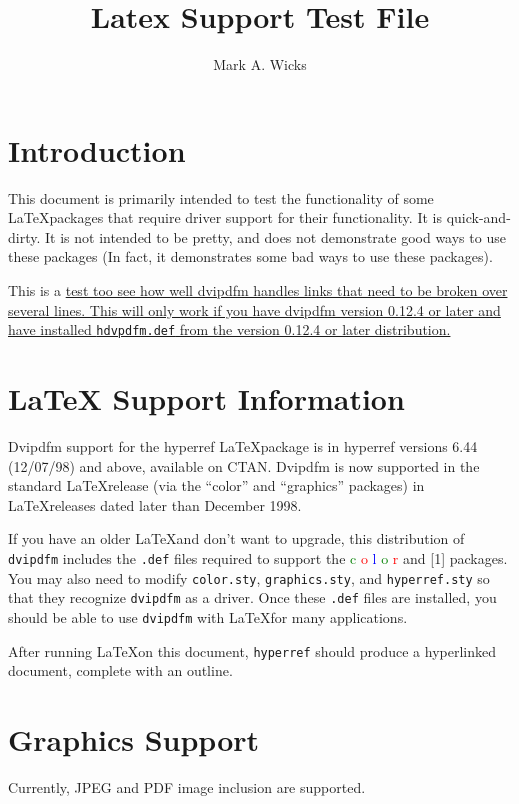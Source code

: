 \documentclass[dvipdfm]{article}
\title{\color{blue}Latex Support Test File}
\author{\color{green}Mark A. Wicks}
\begin{document}
\maketitle
\section{Introduction}
This document is primarily intended
to test the functionality
of some \LaTeX\space packages that require
driver support for their functionality.
It is quick-and-dirty.
It is not intended to be pretty, and
does not demonstrate good ways to use these packages
(In fact, it demonstrates some bad ways to use these packages).

This is a \href{https://odo.kettering.edu/dvipdfm/}{test too see how
well dvipdfm handles links that need to be broken over several lines.  This
will only work if you have dvipdfm version 0.12.4 or later
and have installed {\tt hdvpdfm.def} from the version 0.12.4 or
later distribution.}

\section{LaTeX Support Information}
Dvipdfm support for the hyperref \LaTeX\space package is
in hyperref versions 6.44 (12/07/98) and above, available on CTAN.
Dvipdfm is now supported in the
standard \LaTeX\space release (via the ``color'' and ``graphics'' packages) in
\LaTeX\space releases dated later than December 1998.

If you have an older LaTeX\space and don't want to upgrade,
this distribution of {\tt dvipdfm} includes
the {\tt .def} files required to support
the
{\textcolor{green}{c}%
\textcolor{red}{o}%
\textcolor{blue}{l}%
\textcolor{green}{o}%
\textcolor{red}{r}
and
\scalebox{1.3}[1]{}
packages.}
You may also need to modify {\tt color.sty}, {\tt graphics.sty},
and {\tt hyperref.sty} so that they
recognize {\tt dvipdfm} as a driver.
Once these {\tt .def} files are installed,
you should be able to use {\tt dvipdfm}
with \LaTeX\space for many applications.

After running \LaTeX\space on this
document, {\tt hyperref}
should produce a hyperlinked
document, complete with an outline.

\newpage
\section{Graphics Support}
Currently, JPEG and PDF image
inclusion are supported.
\end{document}
